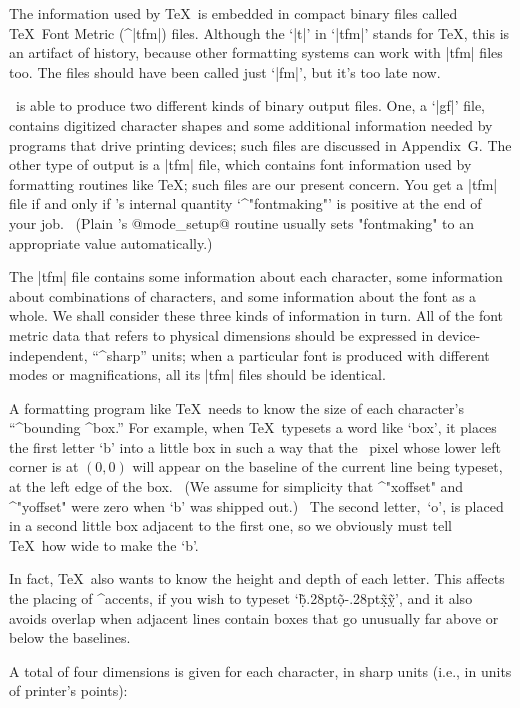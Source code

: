 The information used by \TeX\ is embedded in compact binary files called
\TeX\ Font Metric (^|tfm|) files. Although the `|t|' in `|tfm|' stands
for \TeX, this is an artifact of history, because other formatting systems
can work with |tfm| files too. The files should have been called just `|fm|',
but it's too late now.

\MF\ is able to produce two different kinds of binary output files.
One, a `|gf|' file, contains digitized character shapes and some additional
information needed by programs that drive printing devices; such files
are discussed in Appendix~G\null. The other type of output is a |tfm| file,
which contains font information used by formatting routines like \TeX;
such files are our present concern. You get a |tfm| file if and only
if \MF's internal quantity `^"fontmaking"' is positive at the end
of your job. \ (Plain \MF's @mode\_setup@ routine usually sets
"fontmaking" to an appropriate value automatically.)

\medskip\ninepoint
The |tfm| file contains some information about each character, some
information about combinations of characters, and some information
about the font as a whole. We shall consider these three kinds
of information in turn. All of the font metric data that refers to
physical dimensions should be expressed in device-independent,
``^{sharp}'' units; when a particular font is produced with different
modes or magnifications, all its |tfm| files should be identical.

A formatting program like \TeX\ needs to know the size of each character's
``^{bounding} ^{box}.'' For example, when \TeX\ typesets a word like
`box', it places the first letter `b' into a little box in such a way that
the \MF\ pixel whose lower left corner is at $(0,0)$ will appear
on the baseline of the current line being typeset, at the left edge
of the box. \ (We assume for simplicity that ^"xoffset" and ^"yoffset"
were zero when `b' was shipped out.) \ The second letter,~`o', is placed
in a second little box adjacent to the first one, so we obviously must tell
\TeX\ how wide to make the `b'.

In fact, \TeX\ also wants to know the height and depth of each letter.
This affects the placing of ^{accents}, if you wish to typeset
`\d{\~b}\kern.28pt\d{\~o}\kern-.28pt\d{\~x}\d{\~y}', and it also
avoids overlap when adjacent lines contain boxes that go unusually
far above or below the baselines.

A total of four dimensions is given for each character, in sharp
units (i.e., in units of printer's points):

